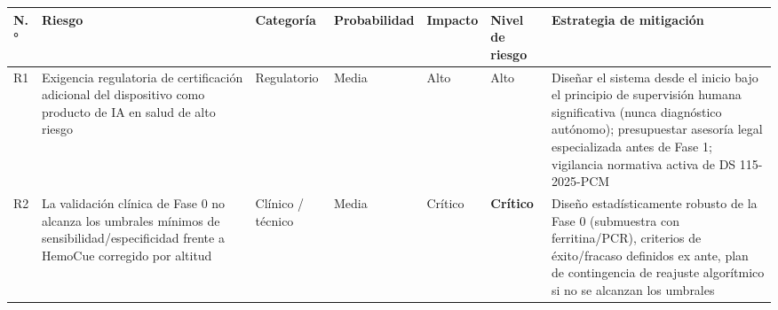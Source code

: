 \documentclass[11pt,a4paper]{article}
\begin{document}
{\small
\begin{longtable}[]{@{}
  >{\raggedright\arraybackslash}p{}
  >{\raggedright\arraybackslash}p{}
  >{\raggedright\arraybackslash}p{}
  >{\raggedright\arraybackslash}p{}
  >{\raggedright\arraybackslash}p{}
  >{\raggedright\arraybackslash}p{}
  >{\raggedright\arraybackslash}p{}@{}}
\toprule\noalign{}
\begin{minipage}[b]{\linewidth}\raggedright
N.°
\end{minipage} & \begin{minipage}[b]{\linewidth}\raggedright
Riesgo
\end{minipage} & \begin{minipage}[b]{\linewidth}\raggedright
Categoría
\end{minipage} & \begin{minipage}[b]{\linewidth}\raggedright
Probabilidad
\end{minipage} & \begin{minipage}[b]{\linewidth}\raggedright
Impacto
\end{minipage} & \begin{minipage}[b]{\linewidth}\raggedright
Nivel de riesgo
\end{minipage} & \begin{minipage}[b]{\linewidth}\raggedright
Estrategia de mitigación
\end{minipage} \\
\midrule\noalign{}
\endhead
\bottomrule\noalign{}
\endlastfoot
R1 & Exigencia regulatoria de certificación adicional del dispositivo como producto de IA en salud de alto riesgo & Regulatorio & Media & Alto & Alto & Diseñar el sistema desde el inicio bajo el principio de supervisión humana significativa (nunca diagnóstico autónomo); presupuestar asesoría legal especializada antes de Fase 1; vigilancia normativa activa de DS 115-2025-PCM \\
R2 & La validación clínica de Fase 0 no alcanza los umbrales mínimos de sensibilidad/especificidad frente a HemoCue corregido por altitud & Clínico / técnico & Media & Crítico & \textbf{Crítico} & Diseño estadísticamente robusto de la Fase 0 (submuestra con ferritina/PCR), criterios de éxito/fracaso definidos ex ante, plan de contingencia de reajuste algorítmico si no se alcanzan los umbrales \\

\end{longtable}}
\end{document}
